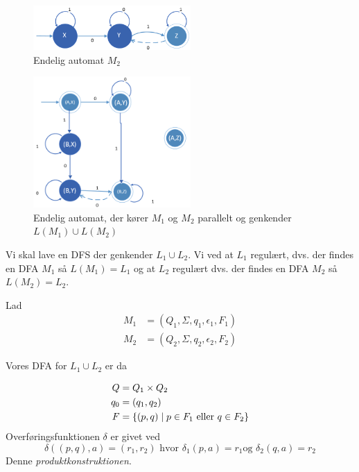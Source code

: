 \documentclass[a4paper,10pt,article]{memoir}
\begin{document}
\begin{figure}
\begin{center}
\includegraphics[width=60mm]{fig5.PNG}
\end{center}
\caption{Endelig automat $M_2$}
\label{fig:m22}
\end{figure}

\begin{figure}
\begin{center}
\includegraphics[width=60mm]{fig6.PNG}
\end{center}
\caption{Endelig automat, der kører $M_1$ og $M_2$ parallelt og
  genkender $L(M_1) \cup L(M_2)$}
\label{fig:m12}
\end{figure}

\begin{bevis}
Vi skal lave en DFS der genkender $L_1 \cup L_2$.
Vi ved at $L_1$ regulært, dvs. der findes en DFA $M_1$ så $L(M_1) =
L_1$ og at $L_2$ regulært dvs. der findes en DFA $M_2$ så $L(M_2) = L_2$.

Lad 
\begin{align*} M_1 & = (Q_1,\Sigma, q_1, \epsilon_1, F_1) \\
 M_2 & = (Q_2,\Sigma, q_2, \epsilon_2, F_2)
\end{align*}

Vores DFA for $L_1 \cup L_2$ er da
  
\begin{align*}
Q & = Q_1 \times Q_2 \\
q_0 & = (q_1, q_2) \\
F & = \{ (p,q) \mid p \in F_1 \text{ eller } q \in F_2 \}
\end{align*}
%
Overføringsfunktionen $\delta$ er givet ved 
%
\[ \delta((p,q),a) = (r_1, r_2) \text{ hvor }\delta_1(p,a)=r_1 \text{
  og } \delta_2(q,a)=r_2 \]
%
Denne \emph{produktkonstruktionen}.
\end{bevis}
\end{document}
